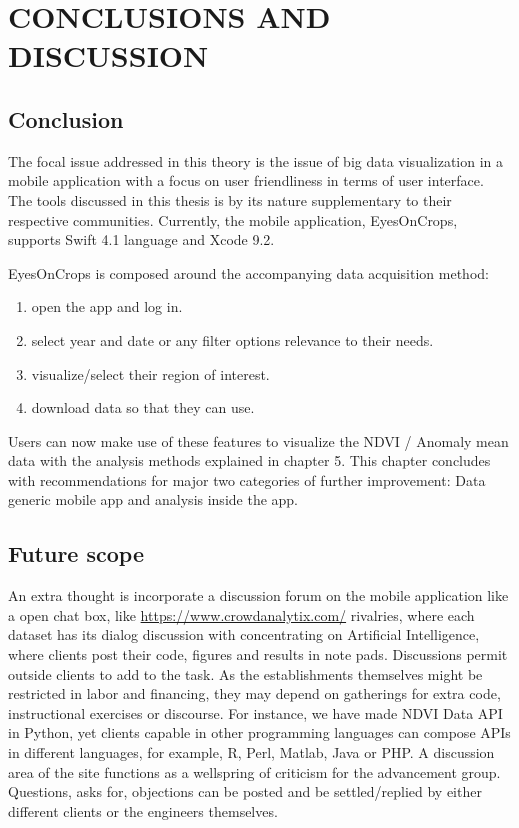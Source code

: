 \chapter{CONCLUSIONS AND DISCUSSION}
\label{chap:conclusion}

\section{Conclusion}

The focal issue addressed in this theory is the issue of big data visualization in a mobile application with a focus on user friendliness in terms of user interface. The tools discussed in this thesis is by its nature supplementary to their respective communities. Currently, the mobile application, EyesOnCrops, supports Swift 4.1 language and Xcode 9.2. 

EyesOnCrops is composed around the accompanying data acquisition method:
\begin{enumerate}
  \item open the app and log in. 
  \item select year and date or any filter options relevance to their needs.
  \item visualize/select their region of interest.
  \item download data so that they can use.
\end{enumerate}

Users can now make use of these features to visualize the NDVI / Anomaly mean data with the analysis methods explained in chapter 5. 
This chapter concludes with recommendations for major two
categories of further improvement: Data generic mobile app and analysis inside the app.

\section{Future scope}

An extra thought is incorporate a discussion forum on the mobile application like a open chat box, like \url{https://www.crowdanalytix.com/} rivalries, where each dataset has its dialog discussion with concentrating on Artificial Intelligence, where clients post their code, figures and results in note pads. Discussions permit outside clients to add to the task. As the establishments themselves might be restricted in labor and financing, they may depend on gatherings for extra code, instructional exercises or discourse. For instance, we have made NDVI Data API in Python, yet clients capable in other programming languages can compose APIs in different languages, for example, R, Perl, Matlab, Java or PHP. A discussion area of the site functions as a wellspring of criticism for the advancement group. Questions, asks for, objections can be posted and be settled/replied by either different clients or the engineers themselves. \\

